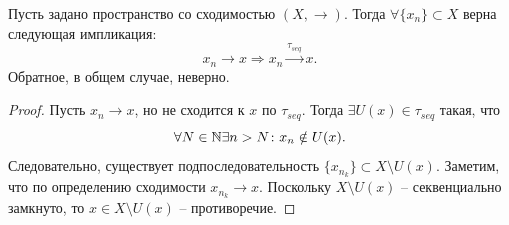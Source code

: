 \begin{proposition}
    Пусть задано пространство со сходимостью $(X, \rightarrow)$.
    Тогда $\forall \{x_n\} \subset X$ верна следующая импликация:
    \[
        x_n \rightarrow x \Rightarrow x_n \xrightarrow{\tau_{seq}} x.
    \]
    Обратное, в общем случае, неверно.
\end{proposition}
\begin{proof}
    Пусть $x_n \rightarrow x$, но не сходится к $x$ по $\tau_{seq}$.
    Тогда $\exists U(x) \in \tau_{seq}$ такая, что
    \[
        \forall N \in \mathbb{N} \exists n > N\colon x_n \notin U(x).
    \]
    Следовательно, существует подпоследовательность $\{x_{n_k}\} \subset X \setminus U(x)$.
    Заметим, что по определению сходимости $x_{n_k} \rightarrow x$.
    Поскольку $X \setminus U(x)$ -- секвенциально замкнуто, то $x \in X \setminus U(x)$ -- противоречие.
\end{proof}
